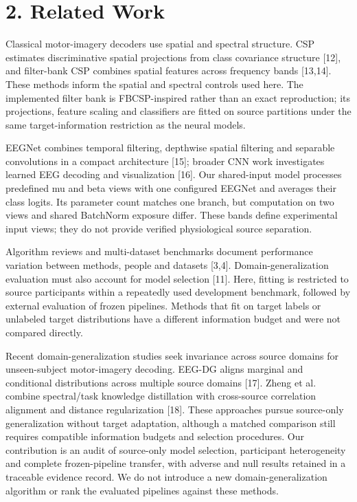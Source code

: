 \documentclass[11pt]{article}
\begin{document}
\section*{2. Related Work}
Classical motor-imagery decoders use spatial and spectral structure. CSP estimates discriminative spatial projections from class covariance structure [12], and filter-bank CSP combines spatial features across frequency bands [13,14]. These methods inform the spatial and spectral controls used here. The implemented filter bank is FBCSP-inspired rather than an exact reproduction; its projections, feature scaling and classifiers are fitted on source partitions under the same target-information restriction as the neural models.

EEGNet combines temporal filtering, depthwise spatial filtering and separable convolutions in a compact architecture [15]; broader CNN work investigates learned EEG decoding and visualization [16]. Our shared-input model processes predefined mu and beta views with one configured EEGNet and averages their class logits. Its parameter count matches one branch, but computation on two views and shared BatchNorm exposure differ. These bands define experimental input views; they do not provide verified physiological source separation.

Algorithm reviews and multi-dataset benchmarks document performance variation between methods, people and datasets [3,4]. Domain-generalization evaluation must also account for model selection [11]. Here, fitting is restricted to source participants within a repeatedly used development benchmark, followed by external evaluation of frozen pipelines. Methods that fit on target labels or unlabeled target distributions have a different information budget and were not compared directly.

Recent domain-generalization studies seek invariance across source domains for unseen-subject motor-imagery decoding. EEG-DG aligns marginal and conditional distributions across multiple source domains [17]. Zheng et al. combine spectral/task knowledge distillation with cross-source correlation alignment and distance regularization [18]. These approaches pursue source-only generalization without target adaptation, although a matched comparison still requires compatible information budgets and selection procedures. Our contribution is an audit of source-only model selection, participant heterogeneity and complete frozen-pipeline transfer, with adverse and null results retained in a traceable evidence record. We do not introduce a new domain-generalization algorithm or rank the evaluated pipelines against these methods.
\end{document}
